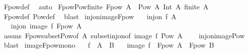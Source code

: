 \begin{isabellebody}
%
\isadelimproof
%
\endisadelimproof
%
\isatagproof
{}\isamarkupfalse%
\ Fpow{\isacharunderscore}{\kern0pt}def\ \isamarkupfalse%
\ auto%
\endisatagproof
{\isafoldproof}%
%
\isadelimproof
\isanewline
%
\endisadelimproof
\isanewline
{}\isamarkupfalse%
\ Fpow{\isacharunderscore}{\kern0pt}Pow{\isacharunderscore}{\kern0pt}finite{\isacharcolon}{\kern0pt}\ {\isachardoublequoteopen}Fpow\ A\ {\isacharequal}{\kern0pt}\ Pow\ A\ Int\ {\isacharbraceleft}{\kern0pt}A{\isachardot}{\kern0pt}\ finite\ A{\isacharbraceright}{\kern0pt}{\isachardoublequoteclose}\isanewline
%
\isadelimproof
%
\endisadelimproof
%
\isatagproof
{}\isamarkupfalse%
\ Fpow{\isacharunderscore}{\kern0pt}def\ Pow{\isacharunderscore}{\kern0pt}def\ \isamarkupfalse%
\ blast%
\endisatagproof
{\isafoldproof}%
%
\isadelimproof
\isanewline
%
\endisadelimproof
\isanewline
{}\isamarkupfalse%
\ inj{\isacharunderscore}{\kern0pt}on{\isacharunderscore}{\kern0pt}image{\isacharunderscore}{\kern0pt}Fpow{\isacharcolon}{\kern0pt}\isanewline
\ \ \ {\isachardoublequoteopen}inj{\isacharunderscore}{\kern0pt}on\ f\ A{\isachardoublequoteclose}\isanewline
\ \ \ {\isachardoublequoteopen}inj{\isacharunderscore}{\kern0pt}on\ {\isacharparenleft}{\kern0pt}image\ f{\isacharparenright}{\kern0pt}\ {\isacharparenleft}{\kern0pt}Fpow\ A{\isacharparenright}{\kern0pt}{\isachardoublequoteclose}\isanewline
%
\isadelimproof
\ \ %
\endisadelimproof
%
\isatagproof
{}\isamarkupfalse%
\ assms\ Fpow{\isacharunderscore}{\kern0pt}subset{\isacharunderscore}{\kern0pt}Pow{\isacharbrackleft}{\kern0pt}of\ A{\isacharbrackright}{\kern0pt}\ subset{\isacharunderscore}{\kern0pt}inj{\isacharunderscore}{\kern0pt}on{\isacharbrackleft}{\kern0pt}of\ {\isachardoublequoteopen}image\ f{\isachardoublequoteclose}\ {\isachardoublequoteopen}Pow\ A{\isachardoublequoteclose}{\isacharbrackright}{\kern0pt}\isanewline
\ \ \ \ inj{\isacharunderscore}{\kern0pt}on{\isacharunderscore}{\kern0pt}image{\isacharunderscore}{\kern0pt}Pow\ \isamarkupfalse%
\ blast%
\endisatagproof
{\isafoldproof}%
%
\isadelimproof
\isanewline
%
\endisadelimproof
\isanewline
{}\isamarkupfalse%
\ image{\isacharunderscore}{\kern0pt}Fpow{\isacharunderscore}{\kern0pt}mono{\isacharcolon}{\kern0pt}\isanewline
\ \ \ {\isachardoublequoteopen}f\ {\isacharbackquote}{\kern0pt}\ A\ {\isasymsubseteq}\ B{\isachardoublequoteclose}\isanewline
\ \ \ {\isachardoublequoteopen}{\isacharparenleft}{\kern0pt}image\ f{\isacharparenright}{\kern0pt}\ {\isacharbackquote}{\kern0pt}\ {\isacharparenleft}{\kern0pt}Fpow\ A{\isacharparenright}{\kern0pt}\ {\isasymsubseteq}\ Fpow\ B{\isachardoublequoteclose}\isanewline

\end{isabellebody}
